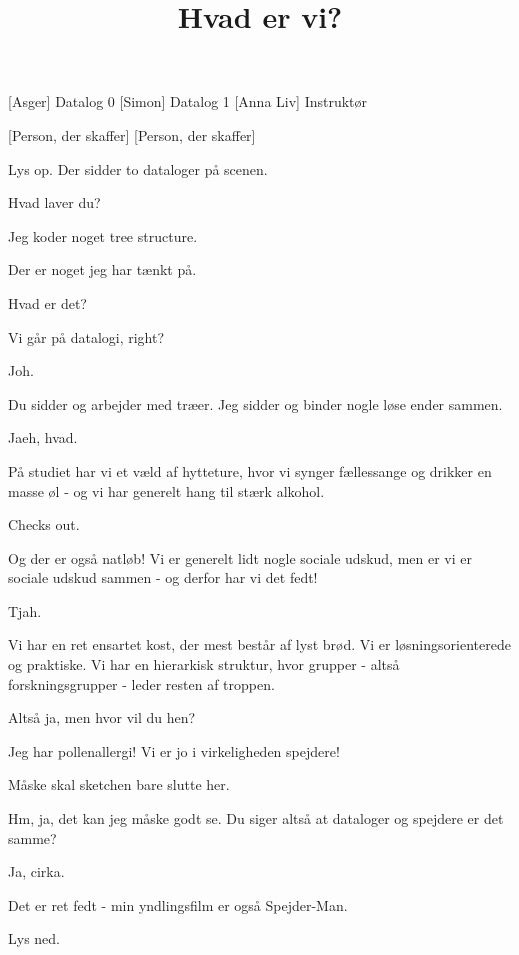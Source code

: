 \documentclass{article}
\title{Hvad er vi?}
\begin{document}
\maketitle

\begin{roles}
[Asger] Datalog 0
[Simon] Datalog 1
[Anna Liv] Instruktør
\end{roles}

\begin{props}
[Person, der skaffer]
[Person, der skaffer]

\end{props}

\begin{sketch}

\scene Lys op. Der sidder to dataloger på scenen.


 Hvad laver du?

 Jeg koder noget tree structure.

 Der er noget jeg har tænkt på.

 Hvad er det?

 Vi går på datalogi, right?

 Joh.

 Du sidder og arbejder med træer. Jeg sidder og binder nogle løse ender sammen.

 Jaeh, hvad.

 På studiet har vi et væld af hytteture, hvor vi synger fællessange og drikker en masse øl - og vi har generelt hang til stærk alkohol.

 Checks out.

 Og der er også natløb! Vi er generelt lidt nogle sociale udskud, men er vi er sociale udskud sammen - og derfor har vi det fedt!

 Tjah.

 Vi har en ret ensartet kost, der mest består af lyst brød. Vi er løsningsorienterede og praktiske. Vi har en hierarkisk struktur, hvor grupper - altså forskningsgrupper - leder resten af troppen.

 Altså ja, men hvor vil du hen?

 Jeg har pollenallergi! Vi er jo i virkeligheden spejdere!

\scene Måske skal sketchen bare slutte her.

 Hm, ja, det kan jeg måske godt se. Du siger altså at dataloger og spejdere er det samme?

 Ja, cirka.

 Det er ret fedt - min yndlingsfilm er også Spejder-Man.


\scene Lys ned.


\end{sketch}
\end{document}
